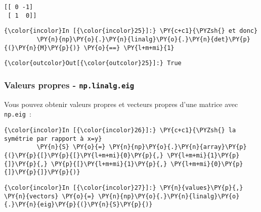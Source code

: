     \begin{Verbatim}[commandchars=\\\{\},frame=single,framerule=0.3mm,rulecolor=\color{cellframecolor}]
[[ 0 -1]
 [ 1  0]]
\end{Verbatim}

    \begin{Verbatim}[commandchars=\\\{\},frame=single,framerule=0.3mm,rulecolor=\color{cellframecolor}]
{\color{incolor}In [{\color{incolor}25}]:} \PY{c+c1}{\PYZsh{} et donc}
         \PY{n}{np}\PY{o}{.}\PY{n}{linalg}\PY{o}{.}\PY{n}{det}\PY{p}{(}\PY{n}{M}\PY{p}{)} \PY{o}{==} \PY{l+m+mi}{1}
\end{Verbatim}


\begin{Verbatim}[commandchars=\\\{\},frame=single,framerule=0.3mm,rulecolor=\color{cellframecolor}]
{\color{outcolor}Out[{\color{outcolor}25}]:} True
\end{Verbatim}
            
    \hypertarget{valeurs-propres---np.linalg.eig}{%
\subsubsection{\texorpdfstring{Valeurs propres -
\texttt{np.linalg.eig}}{Valeurs propres - np.linalg.eig}}\label{valeurs-propres---np.linalg.eig}}

    Vous pouvez obtenir valeurs propres et vecteurs propres d'une matrice
avec \texttt{np.eig}~:

    \begin{Verbatim}[commandchars=\\\{\},frame=single,framerule=0.3mm,rulecolor=\color{cellframecolor}]
{\color{incolor}In [{\color{incolor}26}]:} \PY{c+c1}{\PYZsh{} la symétrie par rapport à x=y}
         \PY{n}{S} \PY{o}{=} \PY{n}{np}\PY{o}{.}\PY{n}{array}\PY{p}{(}\PY{p}{[}\PY{p}{[}\PY{l+m+mi}{0}\PY{p}{,} \PY{l+m+mi}{1}\PY{p}{]}\PY{p}{,} \PY{p}{[}\PY{l+m+mi}{1}\PY{p}{,} \PY{l+m+mi}{0}\PY{p}{]}\PY{p}{]}\PY{p}{)}
\end{Verbatim}


    \begin{Verbatim}[commandchars=\\\{\},frame=single,framerule=0.3mm,rulecolor=\color{cellframecolor}]
{\color{incolor}In [{\color{incolor}27}]:} \PY{n}{values}\PY{p}{,} \PY{n}{vectors} \PY{o}{=} \PY{n}{np}\PY{o}{.}\PY{n}{linalg}\PY{o}{.}\PY{n}{eig}\PY{p}{(}\PY{n}{S}\PY{p}{)}
\end{Verbatim}



